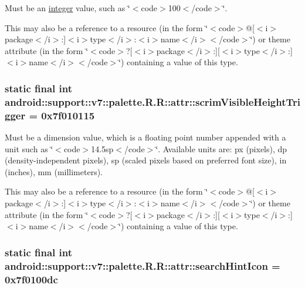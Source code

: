 Must be an \hyperlink{classandroid_1_1support_1_1v7_1_1palette_1_1_r_1_1integer}{integer} value, such as \char`\"{}$<$code$>$100$<$/code$>$\char`\"{}. 

This may also be a reference to a resource (in the form \char`\"{}$<$code$>$@\mbox{[}$<$i$>$package$<$/i$>$:\mbox{]}$<$i$>$type$<$/i$>$:$<$i$>$name$<$/i$>$$<$/code$>$\char`\"{}) or theme attribute (in the form \char`\"{}$<$code$>$?\mbox{[}$<$i$>$package$<$/i$>$:\mbox{]}\mbox{[}$<$i$>$type$<$/i$>$:\mbox{]}$<$i$>$name$<$/i$>$$<$/code$>$\char`\"{}) containing a value of this type. \hypertarget{classandroid_1_1support_1_1v7_1_1palette_1_1_r_1_1attr_1707058159b7f9972673f5a5e0d3e6e8}{
\subsubsection[{scrimVisibleHeightTrigger}]{\setlength{\rightskip}{0pt plus 5cm}static final int android::support::v7::palette.R.R::attr::scrimVisibleHeightTrigger = 0x7f010115}}
\label{classandroid_1_1support_1_1v7_1_1palette_1_1_r_1_1attr_1707058159b7f9972673f5a5e0d3e6e8}


Must be a dimension value, which is a floating point number appended with a unit such as \char`\"{}$<$code$>$14.5sp$<$/code$>$\char`\"{}. Available units are: px (pixels), dp (density-independent pixels), sp (scaled pixels based on preferred font size), in (inches), mm (millimeters). 

This may also be a reference to a resource (in the form \char`\"{}$<$code$>$@\mbox{[}$<$i$>$package$<$/i$>$:\mbox{]}$<$i$>$type$<$/i$>$:$<$i$>$name$<$/i$>$$<$/code$>$\char`\"{}) or theme attribute (in the form \char`\"{}$<$code$>$?\mbox{[}$<$i$>$package$<$/i$>$:\mbox{]}\mbox{[}$<$i$>$type$<$/i$>$:\mbox{]}$<$i$>$name$<$/i$>$$<$/code$>$\char`\"{}) containing a value of this type. \hypertarget{classandroid_1_1support_1_1v7_1_1palette_1_1_r_1_1attr_39b0c88d0bd28f66810ac2fcc23da6f0}{
\subsubsection[{searchHintIcon}]{\setlength{\rightskip}{0pt plus 5cm}static final int android::support::v7::palette.R.R::attr::searchHintIcon = 0x7f0100dc}}
\label{classandroid_1_1support_1_1v7_1_1palette_1_1_r_1_1attr_39b0c88d0bd28f66810ac2fcc23da6f0}


